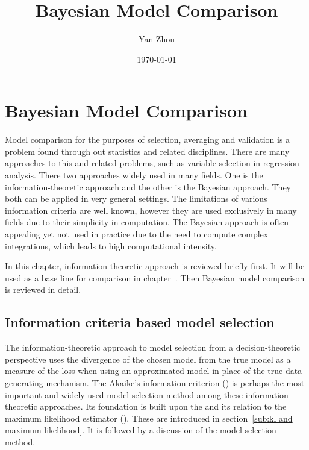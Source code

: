 \documentclass[10pt, hyper, bib, fontset=Lucida,
linespread=1.3, typearearatio=0.75]{marticle}
\title{Bayesian Model Comparison}
\author{Yan Zhou}
\date{\today}
\begin{document}
\maketitle

\else %

\chapter{Bayesian Model Comparison}
\label{cha:Bayesian Model Comparison}

\fi %

Model comparison for the purposes of selection, averaging and validation is a
problem found through out statistics and related disciplines. There are many
approaches to this and related problems, such as variable selection in
regression analysis. There two approaches widely used in many fields. One is
the information-theoretic approach and the other is the Bayesian approach.
They both can be applied in very general settings. The limitations of various
information criteria are well known, however they are used exclusively in many
fields due to their simplicity in computation. The Bayesian approach is often
appealing yet not used in practice due to the need to compute complex
integrations, which leads to high computational intensity.

In this chapter, information-theoretic approach is reviewed briefly first. It
will be used as a base line for comparison in chapter~. Then
Bayesian model comparison is reviewed in detail.

\section{Information criteria based model selection}
\label{sec:Information criteria based model selection}


The information-theoretic approach to model selection from a
decision-theoretic perspective uses the divergence of the chosen model from
the true model as a measure of the loss when using an approximated model in
place of the true data generating mechanism. The Akaike's information
criterion (\aic) is perhaps the most important and widely used model selection
method among these information-theoretic approaches. Its foundation is built
upon the \kl and its relation to the maximum likelihood estimator (\mle).
These are introduced in section~\ref{sub:kl and maximum likelihood}. It is
followed by a discussion of the \aic model selection method.
\end{document}

